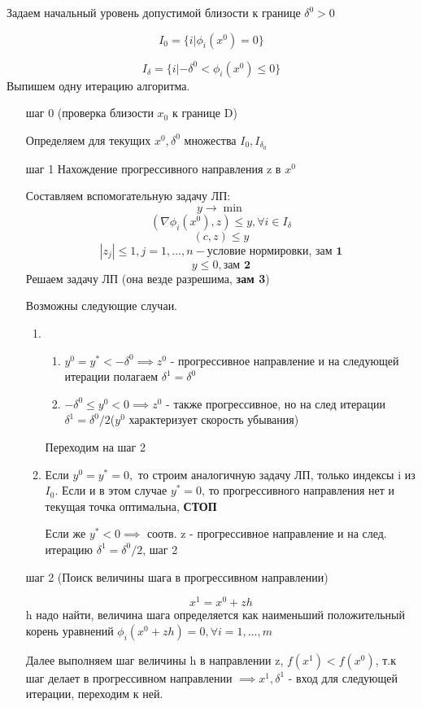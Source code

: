 \documentclass[a4paper]{article}
\theoremstyle{definition}
\theoremstyle{remark}
\begin{document}
Задаем начальный уровень допустимой близости к границе $\delta^0>0$

\[I_0 = \{i | \phi_i(x^0) = 0\}\]

\[I_\delta = \{i | -\delta^0<\phi_i(x^0) \leq 0\}\]
Выпишем одну итерацию алгоритма.
\begin{enumerate}
    \item[шаг 0] (проверка близости $x_0$ к границе D)

    Определяем для текущих $x^0, \delta^0$ множества $I_0, I_{\delta_0}$
    \item[шаг 1] Нахождение прогрессивного направления z в $x^0$

    Составляем вспомогательную задачу ЛП:
    \[y\to \min\]
    \[(\nabla \phi_i(x^0), z)\le y ,\forall i \in I_\delta\]
    \[(c, z)\le y\]
    \[|z_j|\le 1, j = 1, \dots, n - \text{условие нормировки, }\textbf{зам 1}\]
    \[y \le 0, \textbf{зам 2}\]
    Решаем задачу ЛП (она везде разрешима, \textbf{зам 3})

    Возможны следующие случаи.
    \begin{enumerate}
        \item \begin{enumerate}
            \item $y^0 = y^* < -\delta^0\implies z^0$ - прогрессивное направление и на следующей итерации полагаем $\delta^1 = \delta^0$
            \item $-\delta^0 \le y^0 < 0 \implies z^0$ - также прогрессивное, но на след итерации $\delta^1 = \delta^0/2$($y^0$ характеризует скорость убывания)
        \end{enumerate}
        Переходим на шаг 2
        \item Если $y^0 = y^* = 0, $ то строим аналогичную задачу ЛП, только индексы i из $I_0$. Если и в этом случае $y^* = 0$, то прогрессивного направления нет и текущая точка оптимальна, \textbf{СТОП}

        Если же $y^* < 0\implies$ соотв. z - прогрессивное направление и на след. итерацию $\delta^1 = \delta^0 /2$, шаг 2
    \end{enumerate}
    \item[шаг 2](Поиск величины шага в прогрессивном направлении)

    \[x^1 = x^0 + zh\]
    h надо найти, величина шага определяется как наименьший положительный корень уравнений $\phi_i(x^0 +zh) = 0, \forall i = 1, \dots, m$

    Далее выполняем шаг величины h в направлении z, $f(x^1) < f(x^0)$, т.к шаг делает в прогрессивном направлении $\implies x^1, \delta^1$ - вход для следующей итерации, переходим к ней.
\end{enumerate}
\end{document}
